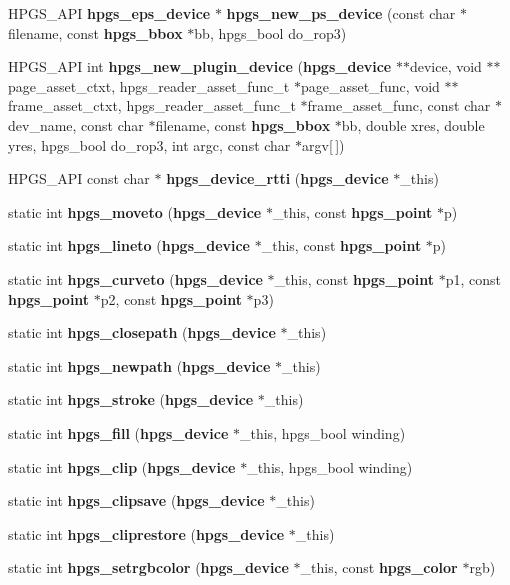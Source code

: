 \begin{CompactItemize}
\item 
HPGS\_\-API {\bf hpgs\_\-eps\_\-device} $\ast$ {\bf hpgs\_\-new\_\-ps\_\-device} (const char $\ast$filename, const {\bf hpgs\_\-bbox} $\ast$bb, hpgs\_\-bool do\_\-rop3)
\item 
HPGS\_\-API int \textbf{hpgs\_\-new\_\-plugin\_\-device} ({\bf hpgs\_\-device} $\ast$$\ast$device, void $\ast$$\ast$page\_\-asset\_\-ctxt, hpgs\_\-reader\_\-asset\_\-func\_\-t $\ast$page\_\-asset\_\-func, void $\ast$$\ast$frame\_\-asset\_\-ctxt, hpgs\_\-reader\_\-asset\_\-func\_\-t $\ast$frame\_\-asset\_\-func, const char $\ast$dev\_\-name, const char $\ast$filename, const {\bf hpgs\_\-bbox} $\ast$bb, double xres, double yres, hpgs\_\-bool do\_\-rop3, int argc, const char $\ast$argv[$\,$])\label{group__device_g32a98f875a08a2a1e5a511ee3f51c5f9}

\item 
HPGS\_\-API const char $\ast$ {\bf hpgs\_\-device\_\-rtti} ({\bf hpgs\_\-device} $\ast$\_\-this)
\item 
static int {\bf hpgs\_\-moveto} ({\bf hpgs\_\-device} $\ast$\_\-this, const {\bf hpgs\_\-point} $\ast$p)
\item 
static int {\bf hpgs\_\-lineto} ({\bf hpgs\_\-device} $\ast$\_\-this, const {\bf hpgs\_\-point} $\ast$p)
\item 
static int {\bf hpgs\_\-curveto} ({\bf hpgs\_\-device} $\ast$\_\-this, const {\bf hpgs\_\-point} $\ast$p1, const {\bf hpgs\_\-point} $\ast$p2, const {\bf hpgs\_\-point} $\ast$p3)
\item 
static int {\bf hpgs\_\-closepath} ({\bf hpgs\_\-device} $\ast$\_\-this)
\item 
static int {\bf hpgs\_\-newpath} ({\bf hpgs\_\-device} $\ast$\_\-this)
\item 
static int {\bf hpgs\_\-stroke} ({\bf hpgs\_\-device} $\ast$\_\-this)
\item 
static int {\bf hpgs\_\-fill} ({\bf hpgs\_\-device} $\ast$\_\-this, hpgs\_\-bool winding)
\item 
static int {\bf hpgs\_\-clip} ({\bf hpgs\_\-device} $\ast$\_\-this, hpgs\_\-bool winding)
\item 
static int {\bf hpgs\_\-clipsave} ({\bf hpgs\_\-device} $\ast$\_\-this)
\item 
static int {\bf hpgs\_\-cliprestore} ({\bf hpgs\_\-device} $\ast$\_\-this)
\item 
static int {\bf hpgs\_\-setrgbcolor} ({\bf hpgs\_\-device} $\ast$\_\-this, const {\bf hpgs\_\-color} $\ast$rgb)
\item 

\end{CompactItemize}
